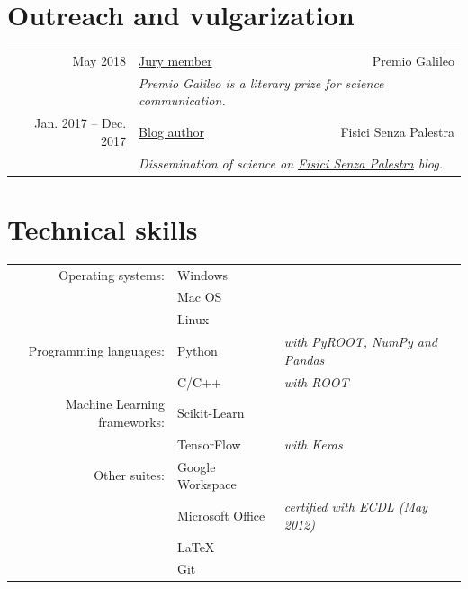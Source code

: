 \documentclass[a4, 11pt]{report}
\begin{document}
    \pagebreak
    
    \section*{Outreach and vulgarization}
        \begin{tabular*}{\textwidth}{rl @{\extracolsep{\fill}} r}
            {\small May 2018} & \ul{Jury member} & {\small Premio Galileo}\\
            & \multicolumn{2}{l}{\small \emph {Premio Galileo is a literary prize for science communication.}}\\ [3mm]
                               
            {\small Jan. 2017 -- Dec. 2017} & \ul{Blog author} & {\small Fisici Senza Palestra}\\
            & \multicolumn{2}{l}{\small \emph {Dissemination of science on \href{https://www.fisicisenzapalestra.com}{\textit{Fisici Senza Palestra}} blog.}}
        \end{tabular*}
        
   \vskip 9mm
    
    \section*{Technical skills}
        \begin{tabular}{rll}
            {\small Operating systems:} & Windows\\
            & Mac OS\\
            & Linux\\ [3mm]
                                        
            {\small Programming languages:} 
            & Python & {\small \emph {with PyROOT, NumPy and Pandas}}\\
            & C/C++ & {\small \emph {with ROOT}}\\ [3mm]
            
            {\small Machine Learning frameworks:} 
            & Scikit-Learn\\
            & TensorFlow & {\small \emph {with Keras}}\\ [3 mm]
                                            
            {\small Other suites:} 
            & Google Workspace\\
            & Microsoft Office & {\small \emph {certified with ECDL (May 2012)}}\\
            & \LaTeX\\
            & Git
        \end{tabular}
\end{document}
